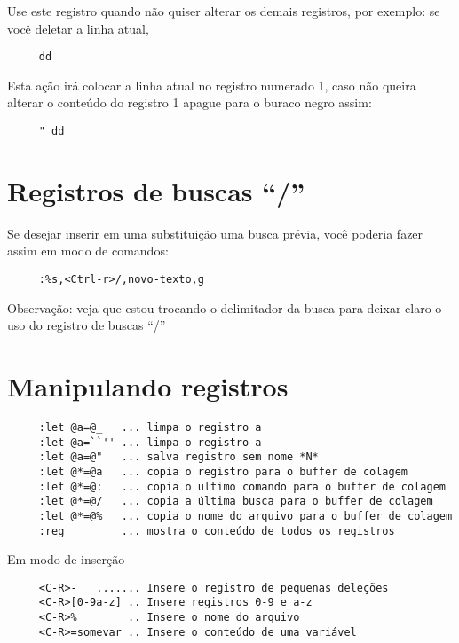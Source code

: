 Use este registro quando não quiser alterar os demais registros, por exemplo:
se você deletar a linha atual,

\begin{verbatim}
     dd
\end{verbatim}

Esta ação irá colocar a linha atual no registro numerado 1, caso não
queira alterar o conteúdo do registro 1 apague para o buraco negro
assim:

\begin{verbatim}
     "_dd
\end{verbatim}

\section{Registros de buscas ``/''}
\label{Registros de buscas ``/''}

Se desejar inserir em uma substituição uma busca prévia, você poderia
fazer assim em modo de comandos:

\begin{verbatim}
     :%s,<Ctrl-r>/,novo-texto,g
\end{verbatim}

Observação: veja que estou trocando o delimitador da busca para deixar
claro o uso do registro de buscas ``/''

\section{Manipulando registros}
\label{Manipulando registros}

\begin{verbatim}
     :let @a=@_   ... limpa o registro a
     :let @a=``'' ... limpa o registro a
     :let @a=@"   ... salva registro sem nome *N*
     :let @*=@a   ... copia o registro para o buffer de colagem
     :let @*=@:   ... copia o ultimo comando para o buffer de colagem
     :let @*=@/   ... copia a última busca para o buffer de colagem
     :let @*=@%   ... copia o nome do arquivo para o buffer de colagem
     :reg         ... mostra o conteúdo de todos os registros
\end{verbatim}

Em modo de inserção

\begin{verbatim}
     <C-R>-   ....... Insere o registro de pequenas deleções
     <C-R>[0-9a-z] .. Insere registros 0-9 e a-z
     <C-R>%        .. Insere o nome do arquivo
     <C-R>=somevar .. Insere o conteúdo de uma variável
\end{verbatim}


